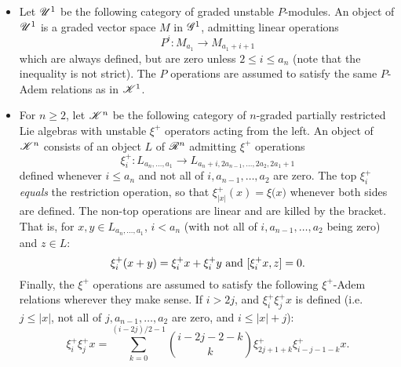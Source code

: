 \documentclass[11pt]{article}
\newcommand{\GoodLie}[1]{\mathsf{g}{\scrL}^{#1}}%
\newcommand{\PRLie}[1]{\scrR^{#1}}%
\newcommand{\LL}[1]{{\scrK}^{#1}}%
\newcommand{\GR}[1]{\scrG^{#1}}%
\newcommand{\nontop}[1]{\scrU^{#1}}%
\newcommand{\restn}[1]{\xi{#1}}
\newcommand{\LambdaOp}{\xi^{+}}
\begin{document}
\begin{CategoriesOfInterest}
\begin{itemize}
\item Let $\nontop{1}$ be the following category of graded unstable $P$-modules. An object of $\nontop{1}$ is a graded vector space $M$ in $\GR{1}$,
admitting linear operations
\[P^i:M_{a_1}\to M_{a_1+i+1}\]
which are always defined, but are zero unless $2\leq i\leq a_n$ (note that the inequality is not strict).
The $P$ operations are assumed to satisfy the same $P$-Adem relations as in $\LL{1}$. %
\item For $n\geq2$, let $\LL{n}$ be the following category of $n$-graded partially restricted Lie algebras with unstable $\LambdaOp$ operators acting from the left. An object of $\LL{n}$ consists of an object $L$ of $\PRLie{n}$ 
admitting $\LambdaOp$ operations
\[\LambdaOp_i:L_{a_n,\ldots,a_1}\to L_{a_n+i,2a_{n-1},\ldots,2a_2,2a_1+1}\]
defined whenever $i\leq a_n$ and not all of $i,a_{n-1},\ldots,a_{2}$ are zero. The top $\LambdaOp_i$ \emph{equals} the restriction operation, so that $\LambdaOp_{|x|}(x)=\restn(x)$ whenever both sides are defined. The non-top operations are linear and are killed by the bracket.
That is, for $x,y\in L_{a_n,\ldots,a_1}$, $i<a_n$ (with not all of $i,a_{n-1},\ldots,a_{2}$ being zero) and $z\in L$: \[\LambdaOp_i{(x+y)}=\LambdaOp_i{x}+\LambdaOp_i{y}\textup{ and }[\LambdaOp_i{x},z]=0.\]
Finally, the $\LambdaOp$ operations are assumed to satisfy the following $\LambdaOp$-Adem relations wherever they make sense. If $i>2j$, and $\LambdaOp_i\LambdaOp_jx$ is defined (i.e.\ $j\leq|x|$, not all of $j,a_{n-1},\ldots,a_2$ are zero, and $i\leq|x|+j$):
\[\LambdaOp_i\LambdaOp_jx=\sum_{k=0}^{(i-2j)/2-1}{i-2j-2-k\choose k}\LambdaOp_{2j+1+k}\LambdaOp_{i-j-1-k}x.\]

\end{itemize}
\end{CategoriesOfInterest}
\end{document}
